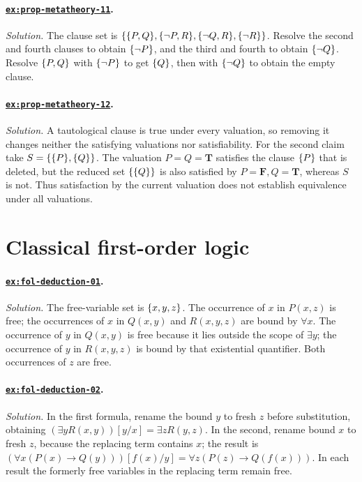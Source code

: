 \documentclass[11pt,oneside,openany]{book}
\theoremstyle{definition}
\theoremstyle{plain}
\theoremstyle{remark}
\DeclarePairedDelimiter{\set}{\lbrace}{\rbrace}
\newcommand{\True}{\mathbf{T}}
\newcommand{\False}{\mathbf{F}}
\begin{document}
\paragraph{\hyperref[ex:prop-metatheory-11]{\texttt{ex:prop-metatheory-11}}.}
\textit{Solution.}  The clause set is
\(\set{\set{P,Q},\set{\neg P,R},\set{\neg Q,R},\set{\neg R}}\).
Resolve the second and fourth clauses to obtain \(\set{\neg P}\), and the
third and fourth to obtain \(\set{\neg Q}\).  Resolve \(\set{P,Q}\) with
\(\set{\neg P}\) to get \(\set{Q}\), then with \(\set{\neg Q}\) to obtain
the empty clause.

\paragraph{\hyperref[ex:prop-metatheory-12]{\texttt{ex:prop-metatheory-12}}.}
\textit{Solution.}  A tautological clause is true under every valuation, so
removing it changes neither the satisfying valuations nor satisfiability.  For
the second claim take \(S=\set{\set{P},\set{Q}}\).  The valuation
\(P=Q=\True\) satisfies the clause \(\set{P}\) that is deleted, but the reduced
set \(\set{\set{Q}}\) is also satisfied by \(P=\False,Q=\True\), whereas
\(S\) is not.  Thus satisfaction by the current valuation does not establish
equivalence under all valuations.

\section{Classical first-order logic}

\paragraph{\hyperref[ex:fol-deduction-01]{\texttt{ex:fol-deduction-01}}.}
\textit{Solution.}  The free-variable set is \(\set{x,y,z}\).  The occurrence
of \(x\) in \(P(x,z)\) is free; the occurrences of \(x\) in \(Q(x,y)\) and
\(R(x,y,z)\) are bound by \(\forall x\).  The occurrence of \(y\) in
\(Q(x,y)\) is free because it lies outside the scope of \(\exists y\); the
occurrence of \(y\) in \(R(x,y,z)\) is bound by that existential quantifier.
Both occurrences of \(z\) are free.

\paragraph{\hyperref[ex:fol-deduction-02]{\texttt{ex:fol-deduction-02}}.}
\textit{Solution.}  In the first formula, rename the bound \(y\) to fresh
\(z\) before substitution, obtaining
\((\exists yR(x,y))[y/x]=\exists zR(y,z)\).  In the second, rename bound
\(x\) to fresh \(z\), because the replacing term contains \(x\); the result is
\((\forall x(P(x)\to Q(y)))[f(x)/y]
=\forall z(P(z)\to Q(f(x)))\).  In each result the formerly free variables in
the replacing term remain free.
\end{document}
